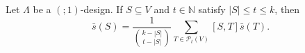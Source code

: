 Let $\Lambda$ be a $(; 1)$-design. If $S \subseteq V$ and $t \in \mathbb{N}$ satisfy $|S| \leq t \leq k$, then
$$\bar{s}(S) = \frac{1}{\binom{k-|S|}{t-|S|}} \sum_{T \in \mathcal{P}_t(V)} [S, T] \bar{s}(T).$$
